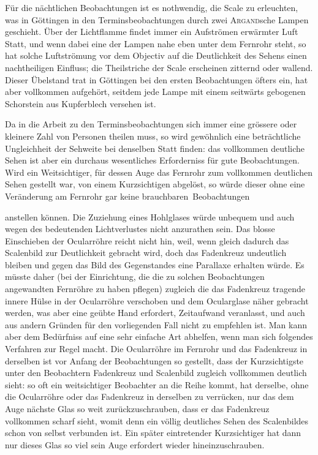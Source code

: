 Für die nächtlichen Beobachtungen ist es nothwendig, die Scale zu erleuchten, was in Göttingen in den Terminsbeobachtungen durch zwei \textsc{Argand}sche Lampen geschieht. Über der Lichtflamme findet immer ein Aufströmen erwärmter Luft Statt, und wenn dabei eine der Lampen nahe eben unter dem Fernrohr steht, so hat solche Luftströmung vor dem Objectiv auf die Deutlichkeit des Sehens einen nachtheiligen Einfluss; die Theilstriche der Scale erscheinen zitternd oder wallend. Dieser Übelstand trat in Göttingen bei den ersten Beobachtungen öfters ein, hat aber vollkommen aufgehört, seitdem jede Lampe mit einem seitwärts gebogenen Schorstein aus Kupferblech versehen ist.

Da in die Arbeit zu den Terminsbeobachtungen sich immer eine grössere oder kleinere Zahl von Personen theilen muss, so wird gewöhnlich eine beträchtliche Ungleichheit der Sehweite bei denselben Statt finden: das vollkommen deutliche Sehen ist aber ein durchaus wesentliches Erforderniss für gute Beobachtungen. Wird ein Weitsichtiger, für dessen Auge das Fernrohr zum vollkommen deutlichen Sehen gestellt war, von einem Kurzsichtigen abgelöst, so würde dieser ohne eine Veränderung am Fernrohr gar keine brauchbaren~Beobachtungen
\par\clearpage
\begingroup
\renewcommand{\footnoterule}{\kern-4.35pt\hrule width .253\columnwidth height .35pt\kern4pt}
\noindent anstellen können. Die Zuziehung eines Hohlglases würde unbequem und auch wegen des bedeutenden Lichtverlustes nicht anzurathen sein. Das blosse Einschieben der Ocularröhre reicht nicht hin, weil, wenn gleich dadurch das Scalenbild zur Deutlichkeit gebracht wird, doch das Fadenkreuz undeutlich bleiben und gegen das Bild des Gegenstandes eine Parallaxe erhalten würde. Es müsste daher (bei der Einrichtung, die die zu solchen Beobachtungen angewandten Fernröhre zu haben pflegen) zugleich die das Fadenkreuz tragende innere Hülse in der Ocularröhre verschoben und dem Ocularglase näher gebracht werden, was aber eine geübte Hand erfordert, Zeitaufwand veranlasst, und auch aus andern Gründen für den vorliegenden Fall nicht zu empfehlen ist. Man kann aber dem Bedürfniss auf eine sehr einfache Art abhelfen, wenn man sich folgendes Verfahren zur Regel macht. Die Ocularröhre im Fernrohr und das Fadenkreuz in derselben ist vor Anfang der Beobachtungen so gestellt, dass der Kurzsichtigste unter den Beobachtern Fadenkreuz und Scalenbild zugleich vollkommen deutlich sieht: so oft ein weitsichtiger Beobachter an die Reihe kommt, hat derselbe, ohne die Ocularröhre oder das Fadenkreuz in derselben zu verrücken, nur das dem Auge nächste Glas so weit zurückzuschrauben, dass er das Fadenkreuz vollkommen scharf sieht, womit denn ein völlig deutliches Sehen des Scalenbildes schon von selbst verbunden ist. Ein später eintretender Kurzsichtiger hat dann nur dieses Glas so viel sein Auge erfordert wieder hineinzuschrauben.

